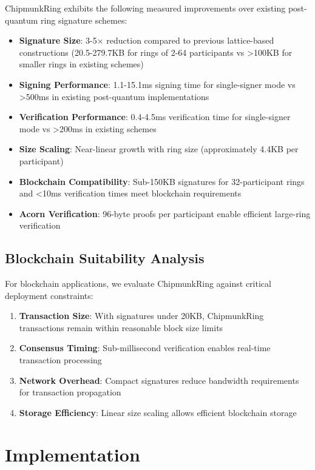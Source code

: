 \documentclass[11pt,a4paper]{article}
\begin{document}
ChipmunkRing exhibits the following measured improvements over existing post-quantum ring signature schemes:

\begin{itemize}
\item \textbf{Signature Size}: 3-5× reduction compared to previous lattice-based constructions (20.5-279.7KB for rings of 2-64 participants vs >100KB for smaller rings in existing schemes)
\item \textbf{Signing Performance}: 1.1-15.1ms signing time for single-signer mode vs >500ms in existing post-quantum implementations  
\item \textbf{Verification Performance}: 0.4-4.5ms verification time for single-signer mode vs >200ms in existing schemes
\item \textbf{Size Scaling}: Near-linear growth with ring size (approximately 4.4KB per participant)
\item \textbf{Blockchain Compatibility}: Sub-150KB signatures for 32-participant rings and <10ms verification times meet blockchain requirements
\item \textbf{Acorn Verification}: 96-byte proofs per participant enable efficient large-ring verification
\end{itemize}

\subsection{Blockchain Suitability Analysis}

For blockchain applications, we evaluate ChipmunkRing against critical deployment constraints:

\begin{enumerate}
\item \textbf{Transaction Size}: With signatures under 20KB, ChipmunkRing transactions remain within reasonable block size limits
\item \textbf{Consensus Timing}: Sub-millisecond verification enables real-time transaction processing
\item \textbf{Network Overhead}: Compact signatures reduce bandwidth requirements for transaction propagation
\item \textbf{Storage Efficiency}: Linear size scaling allows efficient blockchain storage
\end{enumerate}

\section{Implementation}
\end{document}
